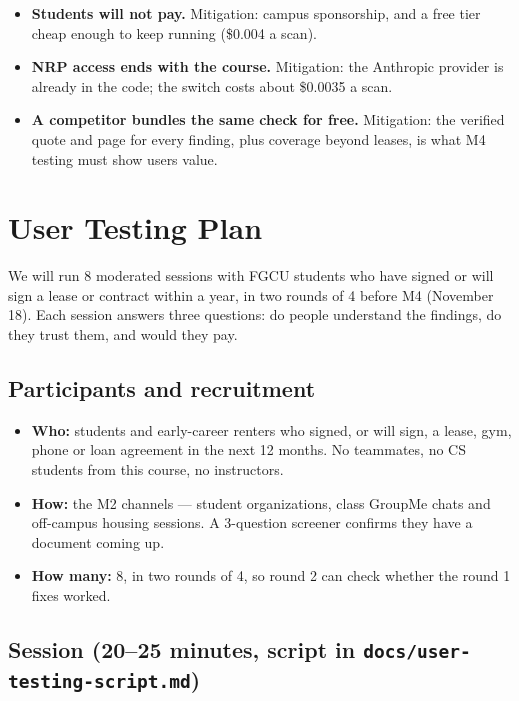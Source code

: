 \documentclass[11pt,letterpaper]{article}
\newcommand{\code}[1]{\texttt{#1}}
\begin{document}
\begin{itemize}
  \item \textbf{Students will not pay.} Mitigation: campus sponsorship, and a free tier cheap enough to keep running (\$0.004 a scan).
  \item \textbf{NRP access ends with the course.} Mitigation: the Anthropic provider is already in the code; the switch costs about \$0.0035 a scan.
  \item \textbf{A competitor bundles the same check for free.} Mitigation: the verified quote and page for every finding, plus coverage beyond leases, is what M4 testing must show users value.
\end{itemize}

\section{User Testing Plan}

We will run 8 moderated sessions with FGCU students who have signed or will sign a lease or contract within a year, in two rounds of 4 before M4 (November 18). Each session answers three questions: do people understand the findings, do they trust them, and would they pay.

\subsection{Participants and recruitment}

\begin{itemize}
  \item \textbf{Who:} students and early-career renters who signed, or will sign, a lease, gym, phone or loan agreement in the next 12 months. No teammates, no CS students from this course, no instructors.
  \item \textbf{How:} the M2 channels --- student organizations, class GroupMe chats and off-campus housing sessions. A 3-question screener confirms they have a document coming up.
  \item \textbf{How many:} 8, in two rounds of 4, so round 2 can check whether the round 1 fixes worked.
\end{itemize}

\subsection{Session (20--25 minutes, script in \code{docs/user-testing-script.md})}
\end{document}
